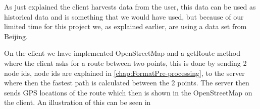 As just explained the client harvests data from the user, this data can be used as historical data and is something that we would have used, but because of our limited time for this project we, as explained earlier, are using a data set from Beijing.

On the client we have implemented OpenStreetMap and a getRoute method where the client asks for a route between two points, this is done by sending 2 node ids, node ids are explained in \ref{chap:FormatPre-processing}, to the server where then the fastest path is calculated between the 2 points. The server then sends GPS locations of the route which then is shown in the OpenStreetMap on the client. An illustration of this can be seen in 	
